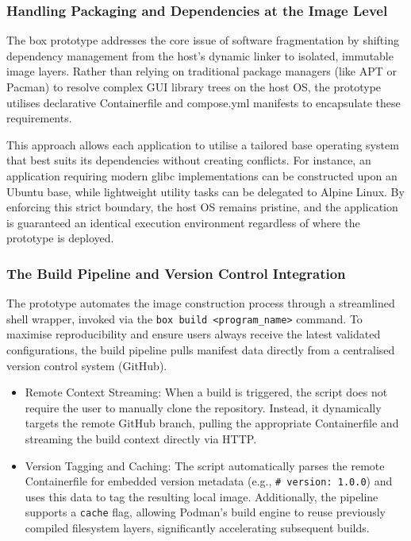 \documentclass[journal,onecolumn]{IEEEtran}
\newcommand{\code}[1]{\texttt{#1}}
\begin{document}
\subsubsection{Handling Packaging and Dependencies at the Image Level}
The box prototype addresses the core issue of software fragmentation by shifting dependency management from the host's dynamic linker to isolated, immutable image layers. Rather than relying on traditional package managers (like APT or Pacman) to resolve complex GUI library trees on the host OS, the prototype utilises declarative Containerfile and compose.yml manifests to encapsulate these requirements.

This approach allows each application to utilise a tailored base operating system that best suits its dependencies without creating conflicts. For instance, an application requiring modern glibc implementations can be constructed upon an Ubuntu base, while lightweight utility tasks can be delegated to Alpine Linux. By enforcing this strict boundary, the host OS remains pristine, and the application is guaranteed an identical execution environment regardless of where the prototype is deployed.

\subsubsection{The Build Pipeline and Version Control Integration}
The prototype automates the image construction process through a streamlined shell wrapper, invoked via the \code{box build <program\_name>} command. To maximise reproducibility and ensure users always receive the latest validated configurations, the build pipeline pulls manifest data directly from a centralised version control system (GitHub).
\begin{itemize}
    \item Remote Context Streaming: When a build is triggered, the script does not require the user to manually clone the repository. Instead, it dynamically targets the remote GitHub branch, pulling the appropriate Containerfile and streaming the build context directly via HTTP.
    \item Version Tagging and Caching: The script automatically parses the remote Containerfile for embedded version metadata (e.g., \code{\# version: 1.0.0}) and uses this data to tag the resulting local image. Additionally, the pipeline supports a \code{cache} flag, allowing Podman's build engine to reuse previously compiled filesystem layers, significantly accelerating subsequent builds.
\end{itemize}
\end{document}
